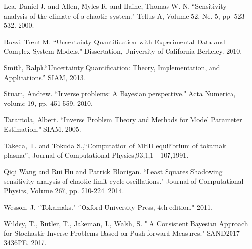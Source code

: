 \documentclass[11pt]{beamer}
\begin{document}
\begin{frame}[allowframebreaks]
\begin{thebibliography}{65}
 Lea, Daniel J. and Allen, Myles R. and Haine, Thomas W. N. ``Sensitivity analysis of the climate of a chaotic system." Tellus A, Volume 52, No. 5, pp. 523-532. 2000.



 Russi, Trent M. ``Uncertainty Quantification with Experimental Data and Complex System Models." Dissertation, University of California Berkeley. 2010.

  Smith, Ralph.``Uncertainty Quantification: Theory, Implementation, and Applications.” SIAM, 2013.

 Stuart, Andrew. ``Inverse problems: A Bayesian perspective." Acta Numerica, volume 19, pp. 451-559. 2010.



 Tarantola, Albert. ``Inverse Problem Theory and Methods for Model Parameter Estimation." SIAM. 2005.

 Takeda, T. and Tokuda S.,``Computation of MHD equilibrium of tokamak plasma'',
Journal of Computational Physics,93,1,1 - 107,1991.

 Qiqi Wang and Rui Hu and Patrick Blonigan. ``Least Squares Shadowing sensitivity analysis of chaotic limit cycle oscillations." Journal of Computational Physics, Volume 267, pp. 210-224. 2014.


 Wesson, J. ``Tokamaks." ``Oxford University Press, 4th edition." 2011.

 Wildey, T., Butler, T., Jakeman, J., Walsh, S. " A Consistent Bayesian Approach for Stochastic Inverse Problems Based on Push-forward Measures." SAND2017-3436PE. 2017.


\end{thebibliography}






\end{frame}
\end{document}
